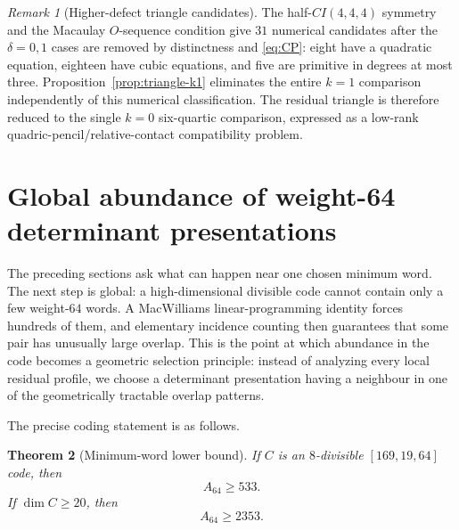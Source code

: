 \documentclass[11pt,reqno]{amsart}
\newtheorem{theorem}{Theorem}[section]
\theoremstyle{remark}
\newtheorem{remark}[theorem]{Remark}
\begin{document}
\begin{remark}[Higher-defect triangle candidates]\label{rem:trianglehigher}
The half-$CI(4,4,4)$ symmetry and the Macaulay $O$-sequence condition give $31$ numerical candidates after the $\delta=0,1$ cases are removed by distinctness and \eqref{eq:CP}: eight have a quadratic equation, eighteen have cubic equations, and five are primitive in degrees at most three.  Proposition~\ref{prop:triangle-k1} eliminates the entire $k=1$ comparison independently of this numerical classification.  The residual triangle is therefore reduced to the single $k=0$ six-quartic comparison, expressed as a low-rank quadric-pencil/relative-contact compatibility problem.
\end{remark}

\section{Global abundance of weight-64 determinant presentations}\label{sec:many}
The preceding sections ask what can happen near one chosen minimum word.  The next step is global: a high-dimensional divisible code cannot contain only a few weight-$64$ words.  A MacWilliams linear-programming identity forces hundreds of them, and elementary incidence counting then guarantees that some pair has unusually large overlap.  This is the point at which abundance in the code becomes a geometric selection principle: instead of analyzing every local residual profile, we choose a determinant presentation having a neighbour in one of the geometrically tractable overlap patterns.

The precise coding statement is as follows.

\begin{theorem}[Minimum-word lower bound]\label{thm:A64}
If $C$ is an $8$-divisible $[169,19,64]$ code, then
\[
A_{64}\ge533.
\]
If $\dim C\ge20$, then
\[
A_{64}\ge2353.
\]
\end{theorem}
\end{document}
